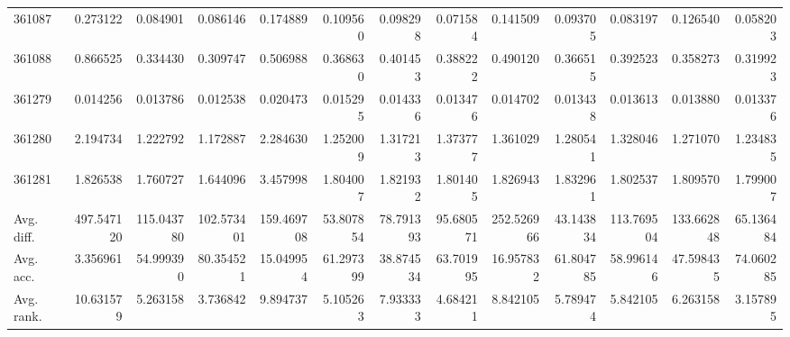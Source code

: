 \begin{tabular}{lrrrrrrrrrrrr}
361087 & 0.273122 & 0.084901 & 0.086146 & 0.174889 & 0.109560 & 0.098298 & 0.071584 & 0.141509 & 0.093705 & 0.083197 & 0.126540 & 0.058203 \\
361088 & 0.866525 & 0.334430 & 0.309747 & 0.506988 & 0.368630 & 0.401453 & 0.388222 & 0.490120 & 0.366515 & 0.392523 & 0.358273 & 0.319923 \\
361279 & 0.014256 & 0.013786 & 0.012538 & 0.020473 & 0.015295 & 0.014336 & 0.013476 & 0.014702 & 0.013438 & 0.013613 & 0.013880 & 0.013376 \\
361280 & 2.194734 & 1.222792 & 1.172887 & 2.284630 & 1.252009 & 1.317213 & 1.373777 & 1.361029 & 1.280541 & 1.328046 & 1.271070 & 1.234835 \\
361281 & 1.826538 & 1.760727 & 1.644096 & 3.457998 & 1.804007 & 1.821932 & 1.801405 & 1.826943 & 1.832961 & 1.802537 & 1.809570 & 1.799007 \\
Avg. diff. & 497.547120 & 115.043780 & 102.573401 & 159.469708 & 53.807854 & 78.791393 & 95.680571 & 252.526966 & 43.143834 & 113.769504 & 133.662848 & 65.136484 \\
Avg. acc. & 3.356961 & 54.999390 & 80.354521 & 15.049954 & 61.297399 & 38.874534 & 63.701995 & 16.957832 & 61.804785 & 58.996146 & 47.598435 & 74.060285 \\
Avg. rank. & 10.631579 & 5.263158 & 3.736842 & 9.894737 & 5.105263 & 7.933333 & 4.684211 & 8.842105 & 5.789474 & 5.842105 & 6.263158 & 3.157895 \\
\bottomrule
\end{tabular}
